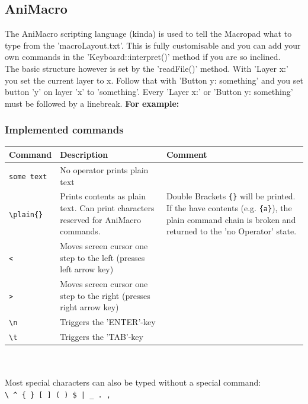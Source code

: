 \documentclass[english, 12pt]{scrartcl}
\begin{document}
	\subsection{AniMacro}
	The AniMacro scripting language (kinda) is used to tell the Macropad what to type from the 'macroLayout.txt'. This is fully customisable and you can add your own commands in the 'Keyboard::interpret()' method if you are so inclined.\\
	The basic structure however is set by the 'readFile()' method. With 'Layer x:' you set the current layer to x. Follow that with 'Button y: something' and you set button 'y' on layer 'x' to 'something'. Every 'Layer x:' or 'Button y: something' must be followed by a linebreak.\newline
	\textbf{For example:}\newline
	\noindent{}\newline
	\subsubsection{Implemented commands}
	\begin{tabular}{|l|m{6.5cm}|m{6.5cm}}
		\hline
		\textbf{Command} & \textbf{Description} & \textbf{Comment}\\
		\hline
		\hline
		\verb=some text= & No operator prints plain text& \\
		\hline
		\verb=\plain{}= & Prints contents as plain text. Can print characters reserved for AniMacro commands. & Double Brackets \verb={}= will be printed. If the have contents (e.g. \verb={a}=), the plain command chain is broken and returned to the 'no Operator' state.\\
		\hline 
		\verb=<= & Moves screen cursor one step to the left (presses left arrow key) & \\
		\verb=>= & Moves screen cursor one step to the right (presses right arrow key) & \\
		\verb=\n= & Triggers the 'ENTER'-key & \\
		\verb=\t= & Triggers the 'TAB'-key & \\
		\hline
	\end{tabular}\\\\
	Most special characters can also be typed without a special command:\\
	\verb=\ ^ { } [ ] ( ) $ | _ . ,=
\end{document}
